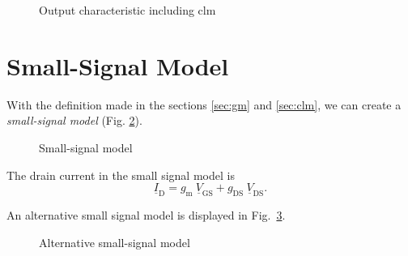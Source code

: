 \documentclass{article}[11pt]
\begin{document}
\begin{figure}[H]
  \centering
  \begin{tikzpicture}[scale=1.2]
    
  \end{tikzpicture} 
  \caption{Output characteristic including \gls{clm}}
  \label{fig:squarelaw-output-clm}
\end{figure}

\section{Small-Signal Model}

With the definition made in the sections \ref{sec:gm} and \ref{sec:clm},
we can create a \textit{small-signal model} 
(Fig. \ref{fig:squarelaw-small-signal}).

\begin{figure}[H]
  \centering
  \begin{circuitikz}
    
  \end{circuitikz} 
  \caption{Small-signal model}
  \label{fig:squarelaw-small-signal}
\end{figure}


The drain current in the small signal model is
\begin{equation}\label{eq:id-ss}
\underline{I}_{\mathrm{D}} =  
g_{\mathrm{m}} \ \underline{V}_{\mathrm{GS}} 
+ g_{\mathrm{DS}} \ \underline{V}_{\mathrm{DS}}.
\end{equation}

An alternative small signal model is displayed in 
Fig.~\ref{fig:alt-squarelaw-small-signal}.

\begin{figure}[H]
  \centering
  \begin{circuitikz}
    
  \end{circuitikz} 
  \caption{Alternative small-signal model \cite[section 7.2.1]{seda-miccirc-20}}
  \label{fig:alt-squarelaw-small-signal}
\end{figure}

\printbibliography
\end{document}
